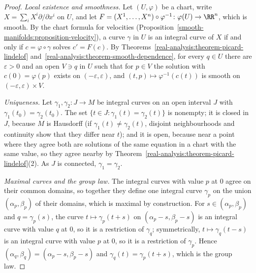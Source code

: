 \begin{proof}
\emph{Local existence and smoothness.} Let $(U, \varphi)$ be a chart, write $X = \sum_iX^i\partial/\partial x^i$ on $U$, and let
$F = (X^1, \ldots, X^n) \circ \varphi^{-1} \colon \varphi(U) \to \RR^n$, which is smooth. By the chart formula for velocities
(Proposition~\ref{smooth-manifolds:proposition-velocity}), a curve $\gamma$ in $U$ is an integral curve of $X$ if and only if $c = \varphi \circ \gamma$ solves
$c' = F(c)$. By Theorems~\ref{real-analysis:theorem-picard-lindelof} and~\ref{real-analysis:theorem-smooth-dependence}, for every $q \in U$ there are
$\varepsilon > 0$ and an open $V \ni q$ in $U$ such that for $p \in V$ the solution with $c(0) = \varphi(p)$ exists on $(-\varepsilon, \varepsilon)$, and
$(t, p) \mapsto \varphi^{-1}(c(t))$ is smooth on $(-\varepsilon, \varepsilon) \times V$.

\emph{Uniqueness.} Let $\gamma_1, \gamma_2 \colon J \to M$ be integral curves on an open interval $J$ with $\gamma_1(t_0) = \gamma_2(t_0)$. The set
$\{t \in J : \gamma_1(t) = \gamma_2(t)\}$ is nonempty; it is closed in $J$, because $M$ is Hausdorff (if $\gamma_1(t) \neq \gamma_2(t)$, disjoint neighbourhoods
and continuity show that they differ near $t$); and it is open, because near a point where they agree both are solutions of the same equation in a chart with
the same value, so they agree nearby by Theorem~\ref{real-analysis:theorem-picard-lindelof}(2). As $J$ is connected, $\gamma_1 = \gamma_2$.

\emph{Maximal curves and the group law.} The integral curves with value $p$ at $0$ agree on their common domains, so together they define one integral curve
$\gamma_p$ on the union $(\alpha_p, \beta_p)$ of their domains, which is maximal by construction. For $s \in (\alpha_p, \beta_p)$ and $q = \gamma_p(s)$, the curve
$t \mapsto \gamma_p(t + s)$ on $(\alpha_p - s, \beta_p - s)$ is an integral curve with value $q$ at $0$, so it is a restriction of $\gamma_q$; symmetrically,
$t \mapsto \gamma_q(t - s)$ is an integral curve with value $p$ at $0$, so it is a restriction of $\gamma_p$. Hence $(\alpha_q, \beta_q) =
(\alpha_p - s, \beta_p - s)$ and $\gamma_q(t) = \gamma_p(t + s)$, which is the group law.


\end{proof}
